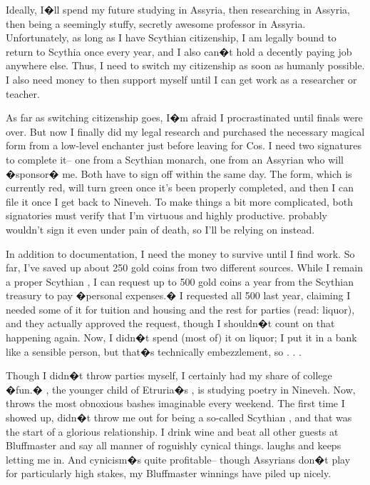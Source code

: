 \documentclass[char]{Kos}
\begin{document}
Ideally, I�ll spend my future studying in Assyria, then researching in Assyria, then being a seemingly stuffy, secretly awesome professor in Assyria. Unfortunately, as long as I have Scythian citizenship, I am legally bound to return to Scythia once every year, and I also can�t hold a decently paying job anywhere else. Thus, I need to switch my citizenship as soon as humanly possible. I also need money to then support myself until I can get work as a researcher or teacher.

As far as switching citizenship goes, I�m afraid I procrastinated until finals were over. But now I finally did my legal research and purchased the necessary magical form from a low-level enchanter just before leaving for Cos. I need two signatures to complete it-- one from a Scythian monarch, one from an Assyrian who will �sponsor� me. Both have to sign off within the same day. The form, which is currently red, will turn green once it's been properly completed, and then I can file it once I get back to Nineveh. To make things a bit more complicated, both signatories must verify that I'm virtuous and highly productive. \cScythiaQueen{\Monarch} \cScythiaQueen{\nickname} probably wouldn't sign it even under pain of death, so I'll be relying on \cScythiaKing{\nickname} instead.

In addition to documentation, I need the money to survive until I find work. So far, I've saved up about 250 gold coins from two different sources. While I remain a proper Scythian \cWard{\prince}, I can request up to 500 gold coins a year from the Scythian treasury to pay �personal expenses.� I requested all 500 last year, claiming I needed some of it for tuition and housing and the rest for parties (read: liquor), and they actually approved the request, though I shouldn�t count on that happening again. Now, I didn�t spend (most of) it on liquor; I put it in a bank like a sensible person, but that�s technically embezzlement, so . . . 

Though I didn�t throw parties myself, I certainly had my share of college �fun.� \cPoet{\Prince} \cPoet{\name}, the younger child of Etruria�s \cEtruriaKing{\Monarch} \cEtruriaKing{\name}, is studying poetry in Nineveh. Now, \cPoet{\they} throws the most obnoxious bashes imaginable every weekend. The first time I showed up, \cPoet{\they} didn�t throw me out for being a so-called Scythian \cWard{\prince}, and that was the start of a glorious relationship. I drink \cPoet{\their} wine and beat all \cPoet{\their} other guests at Bluffmaster and say all manner of roguishly cynical things. \cPoet{\They} laughs and keeps letting me in. And cynicism�s quite profitable-- though Assyrians don�t play for particularly high stakes, my Bluffmaster winnings have piled up nicely.
\end{document}
